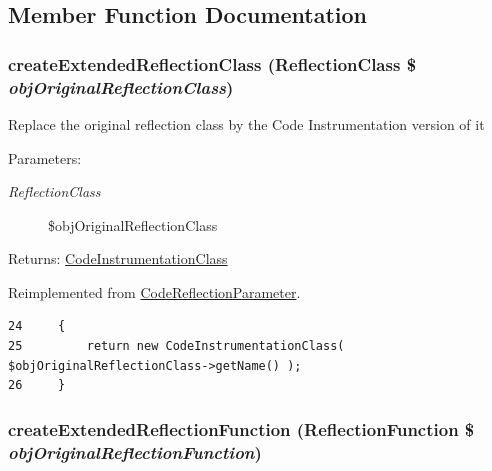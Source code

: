 \subsection{Member Function Documentation}
\hypertarget{class_code_instrumentation_parameter_6b56ec198bc6a5b5a72076e4e7c19e29}{
\subsubsection[{createExtendedReflectionClass}]{\setlength{\rightskip}{0pt plus 5cm}createExtendedReflectionClass (ReflectionClass \$ {\em objOriginalReflectionClass})}}
\label{class_code_instrumentation_parameter_6b56ec198bc6a5b5a72076e4e7c19e29}


Replace the original reflection class by the Code Instrumentation version of it

\begin{Desc}
\item[Parameters:]
\begin{description}
\item[{\em ReflectionClass}]\$objOriginalReflectionClass \end{description}
\end{Desc}
\begin{Desc}
\item[Returns:]\hyperlink{class_code_instrumentation_class}{CodeInstrumentationClass} \end{Desc}


Reimplemented from \hyperlink{class_code_reflection_parameter_6b56ec198bc6a5b5a72076e4e7c19e29}{CodeReflectionParameter}.

\begin{Code}\begin{verbatim}24     {
25         return new CodeInstrumentationClass( $objOriginalReflectionClass->getName() );
26     }
\end{verbatim}
\end{Code}


\hypertarget{class_code_instrumentation_parameter_b23ad87d3ac2f376c1a133ca6d27f031}{
\subsubsection[{createExtendedReflectionFunction}]{\setlength{\rightskip}{0pt plus 5cm}createExtendedReflectionFunction (ReflectionFunction \$ {\em objOriginalReflectionFunction})}}
\label{class_code_instrumentation_parameter_b23ad87d3ac2f376c1a133ca6d27f031}


